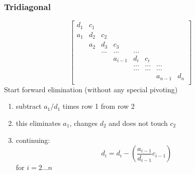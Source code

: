 \documentclass[10pt]{beamer}
\begin{document}
\begin{frame}
\frametitle{Tridiagonal}
\begin{equation*}
  \begin{bmatrix}
d_1 & c_1 &       &         &       &       &          &    \\
a_1 & d_2 & c_2   &         &       &       &          &    \\
    & a_2 & d_3   & c_3     &       &       &          &    \\
    &     & \dots & \dots   & \dots &       &          &    \\
    &     &       & a_{i-1} & d_i   & c_{i} &          &    \\
    &     &       &         & \dots & \dots & \dots    &    \\
    &     &       &         & \dots & \dots & \dots    &    \\
    &     &       &         &       &       & a_{n-1}  & d_n   \\
  \end{bmatrix}
\end{equation*}
Start forward elimination (without any special pivoting)
\begin{enumerate}
  \item subtract $a_1/d_1$ times row 1 from row 2
  \item this eliminates $a_1$, changes $d_2$ and does not touch $c_2$
  \item continuing:
\begin{equation*}
  d_{i} = d_{i} - \left(\frac{a_{i-1}}{d_{i-1}} c_{i-1}\right)
\end{equation*}
for $i=2\dots n$
\end{enumerate}
\end{frame}
\end{document}
